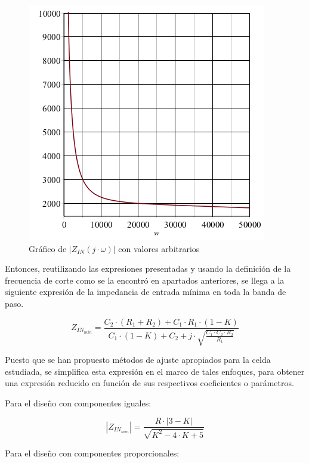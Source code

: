 \begin{figure}[H]
    \centering
    \includegraphics[scale=0.6]{../EJ1/Recursos/impedancia_entrada_arbitraria.png}
    \caption{Gr\'afico de $|Z_{IN}(j \cdot \omega)|$ con valores arbitrarios}
    \label{fig:grafico_zin_ideal_arbitraria}
\end{figure}

Entonces, reutilizando las expresiones presentadas y usando la definici\'on de la frecuencia de corte como se la encontr\'o en apartados anteriores, se llega a la siguiente expresi\'on de la impedancia de entrada
m\'inima en toda la banda de paso.

\begin{equation}
    Z_{IN_{min}} = \frac{C_2 \cdot (R_1 + R_2) + C_1 \cdot R_1 \cdot (1 - K)}{C_1 \cdot (1 - K) + C_2 + j \cdot \sqrt{\frac{C_1 \cdot C_2 \cdot R_2}{R_1}}}
\end{equation}

Puesto que se han propuesto m\'etodos de ajuste apropiados para la celda estudiada, se simplifica esta expresi\'on en el marco de tales enfoques, para obtener una expresi\'on
reducido en funci\'on de sus respectivos coeficientes o par\'ametros.

Para el dise\~no con componentes iguales:

\begin{equation}
    |Z_{IN_{min}}| = \frac{R \cdot |3 - K|}{\sqrt{K^{2} - 4 \cdot K + 5}}
    \label{eq:impedancia_minima_componentes_iguales}
\end{equation}

Para el dise\~no con componentes proporcionales:

